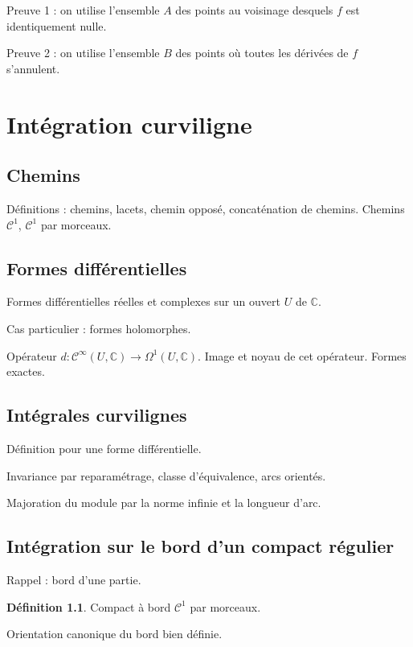 \documentclass[11pt,a4paper]{book}
\newcommand{\C}{\mathbb{C}}
\theoremstyle{definition}
\newtheorem{definition}[theoreme]{D\'efinition}
\theoremstyle{plain}
\begin{document}
Preuve 1 : on utilise l'ensemble $A$ des points au voisinage desquels $f$ est identiquement nulle.

Preuve 2 : on utilise l'ensemble $B$ des points où toutes les dérivées de $f$ s'annulent.

\chapter{Intégration curviligne}

\section{Chemins}

Définitions : chemins, lacets, chemin opposé, concaténation de chemins. Chemins $\mathcal C^1$, $\mathcal C^1$ par morceaux.

\section{Formes différentielles}

Formes différentielles réelles et complexes sur un ouvert $U$ de $\C$.

Cas particulier : formes holomorphes.

Opérateur $d : \mathcal C^{\infty}(U,\C) \to \Omega^1(U,\C)$. Image et noyau de cet opérateur. Formes exactes.

\section{Intégrales curvilignes}

Définition pour une forme différentielle.

Invariance par reparamétrage, classe d'équivalence, arcs orientés.

Majoration du module par la norme infinie et la longueur d'arc.

\section{Intégration sur le bord d'un compact régulier}

Rappel : bord d'une partie.

\begin{definition}
Compact à bord $\mathcal C^1$ par morceaux.
\end{definition}

Orientation canonique du bord bien définie.
\end{document}
